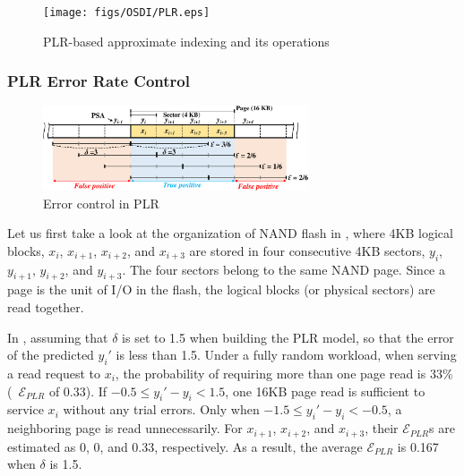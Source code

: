 \begin{figure}[b]
\centering
\texttt{[image: figs/OSDI/PLR.eps]}
\vspace{-5pt}
\caption{PLR-based approximate indexing and its operations}

\label{fig:overall:plr}
\end{figure}

\subsubsection{PLR Error Rate Control}
\begin{figure}[t]
\centering
\includegraphics[height=2.5cm]{figs/OSDI/plr-ctr.eps}
\caption{Error control in PLR}
\label{fig:plr-control}
\vspace{-5pt}
\end{figure}

Let us first take a look at the
organization of NAND flash in , where 
4KB logical blocks, $x_{i}$, $x_{i+1}$, $x_{i+2}$, and $x_{i+3}$
are stored in four consecutive 4KB sectors, $y_{i}$,
$y_{i+1}$, $y_{i+2}$, and $y_{i+3}$.
The four sectors belong to the same NAND page.
Since a page is the unit of I/O in the flash, the logical blocks (or physical sectors) are
read together. 

In , assuming that $\delta$ is set to 1.5 when building the
PLR model, so that the error of the predicted $y_i'$ is less than 1.5.
Under a fully random workload, when serving a read request to $x_{i}$, the
probability of requiring more than one page read is 33\%
(\ie~$\mathcal{E}_{PLR}$ of 0.33).  If $-0.5 \leq y_i'-y_i < 1.5$, one 16KB page
read is sufficient to service $x_{i}$ without any trial errors.  Only when
$-1.5 \leq y_i'-y_i < -0.5$, a neighboring page is read unnecessarily.  For
$x_{i+1}$, $x_{i+2}$, and $x_{i+3}$, their $\mathcal{E}_{PLR}$s are estimated as
0, 0, and 0.33, respectively. As a result, the average $\mathcal{E}_{PLR}$
is 0.167 when $\delta$ is 1.5.

